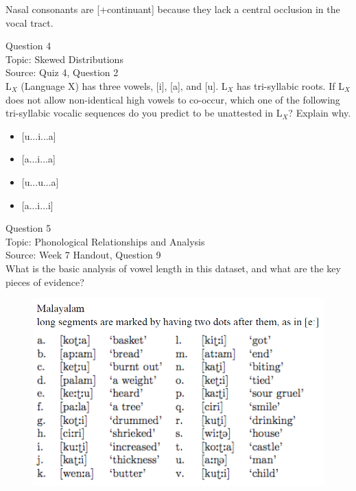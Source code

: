 \documentclass[12pt]{article}
\begin{document}
Nasal consonants are {[+continuant]} because they lack a central occlusion in the vocal tract.


\newpage

{\large Question 4}\\

Topic: Skewed Distributions\\
Source: Quiz 4, Question 2\\

L$_X$ (Language X) has three vowels, [i], [a], and [u]. L$_X$ has tri-syllabic roots. If L$_X$ does not allow non-identical high vowels to co-occur, which one of the following tri-syllabic vocalic sequences do you predict to be unattested in L$_X$? Explain why.\\

\begin{itemize} \item {[u...i...a]} \item {[a...i...a]} \item {[u...u...a]} \item {[a...i...i]} \end{itemize}


\newpage

{\large Question 5}\\

Topic: Phonological Relationships and Analysis\\
Source: Week 7 Handout, Question 9\\

What is the basic analysis of vowel length in this dataset, and what are the key pieces of evidence?\\

\begin{figure}[H]
\includegraphics{../images/malayalam.png}
\end{figure}
\end{document}
